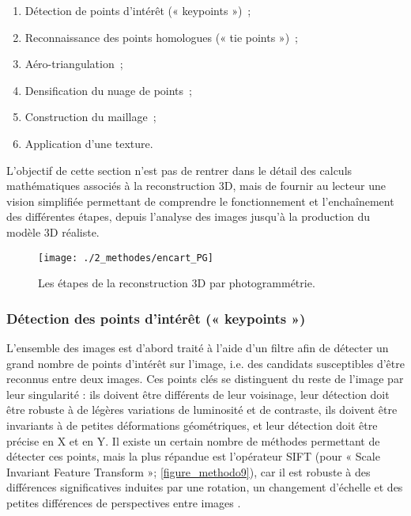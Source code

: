 \begin{enumerate}
    \item Détection de points d’intérêt (« keypoints »)~;
    
    \item Reconnaissance des points homologues (« tie points »)~;
    
    \item Aéro-triangulation~;
    
    \item Densification du nuage de points~;
    
    \item Construction du maillage~;
    
    \item Application d’une texture.
\end{enumerate}

L’objectif de cette section n’est pas de rentrer dans le détail des calculs mathématiques associés à la reconstruction 3D, mais de fournir au lecteur une vision simplifiée permettant de comprendre le fonctionnement et l’enchaînement des différentes étapes, depuis l’analyse des images jusqu’à la production du modèle 3D réaliste.


\begin{sidewaysfigure}
\begin{figure}[H]
	\begin{center}
	\texttt{[image: ./2\_methodes/encart\_PG]}
		\caption[Les étapes de la reconstruction 3D par photogrammétrie]{Les étapes de la reconstruction 3D par photogrammétrie.}
	\label{figure_methodo8}
\end{center}
\end{figure}
\end{sidewaysfigure}

\subsubsection{Détection des points d’intérêt (« keypoints »)}

L’ensemble des images est d’abord traité à l’aide d’un filtre afin de détecter un grand nombre de points d’intérêt sur l’image, i.e. des candidats susceptibles d’être reconnus entre deux images. Ces points clés se distinguent du reste de l’image par leur singularité : ils doivent être différents de leur voisinage, leur détection doit être robuste à de légères variations de luminosité et de contraste, ils doivent être invariants à de petites déformations géométriques, et leur détection doit être précise en X et en Y. Il existe un certain nombre de méthodes permettant de détecter ces points, mais la plus répandue est l’opérateur SIFT (pour « Scale Invariant Feature Transform »; \autoref{figure_methodo9}), car il est robuste à des différences significatives induites par une rotation, un changement d’échelle et des petites différences de perspectives entre images \citep{luhmann_close-range_2014}.

